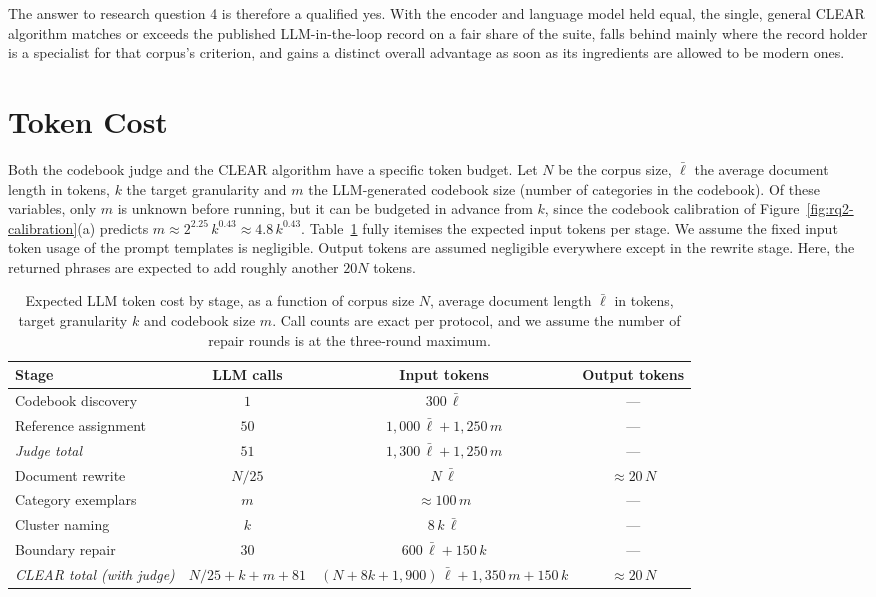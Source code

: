 \documentclass[11pt,a4paper,oneside]{report}
\begin{document}
The answer to research question 4 is therefore a qualified yes. With the encoder and language model held equal, the single, general CLEAR algorithm matches or exceeds the published LLM-in-the-loop record on a fair share of the suite, falls behind mainly where the record holder is a specialist for that corpus's criterion, and gains a distinct overall advantage as soon as its ingredients are allowed to be modern ones.

\section{Token Cost}\label{sec:cost}

Both the codebook judge and the CLEAR algorithm have a specific token budget. Let $N$ be the corpus size, $\bar{\ell}$ the average document length in tokens, $k$ the target granularity and $m$ the LLM-generated codebook size (number of categories in the codebook). Of these variables, only $m$ is unknown before running, but it can be budgeted in advance from $k$, since the codebook calibration of Figure~\ref{fig:rq2-calibration}(a) predicts $m \approx 2^{2.25}\,k^{0.43} \approx 4.8\,k^{0.43}$. Table~\ref{tab:cost} fully itemises the expected input tokens per stage. We assume the fixed input token usage of the prompt templates is negligible. Output tokens are assumed negligible everywhere except in the rewrite stage. Here, the returned phrases are expected to add roughly another $20N$ tokens.

\begin{table}[htbp]
\centering
\small
\begin{tabular}{lccc}
\toprule
Stage & LLM calls & Input tokens & Output tokens \\
\midrule
Codebook discovery & $1$ & $300\,\bar{\ell}$ & --- \\
Reference assignment & $50$ & $1{,}000\,\bar{\ell} + 1{,}250\,m$ & --- \\
\emph{Judge total} & $51$ & $1{,}300\,\bar{\ell} + 1{,}250\,m$ & --- \\
\midrule
Document rewrite & $N/25$ & $N\,\bar{\ell}$ & $\approx 20\,N$ \\
Category exemplars & $m$ & $\approx 100\,m$ & --- \\
Cluster naming & $k$ & $8\,k\,\bar{\ell}$ & --- \\
Boundary repair & $30$ & $600\,\bar{\ell} + 150\,k$ & --- \\
\emph{CLEAR total (with judge)} & $N/25 + k + m + 81$ & $(N + 8k + 1{,}900)\,\bar{\ell} + 1{,}350\,m + 150\,k$ & $\approx 20\,N$ \\
\bottomrule
\end{tabular}
\caption[Expected token cost by stage]{Expected LLM token cost by stage, as a function of corpus size $N$, average document length $\bar{\ell}$ in tokens, target granularity $k$ and codebook size $m$. Call counts are exact per protocol, and we assume the number of repair rounds is at the three-round maximum.}
\label{tab:cost}
\end{table}
\end{document}

